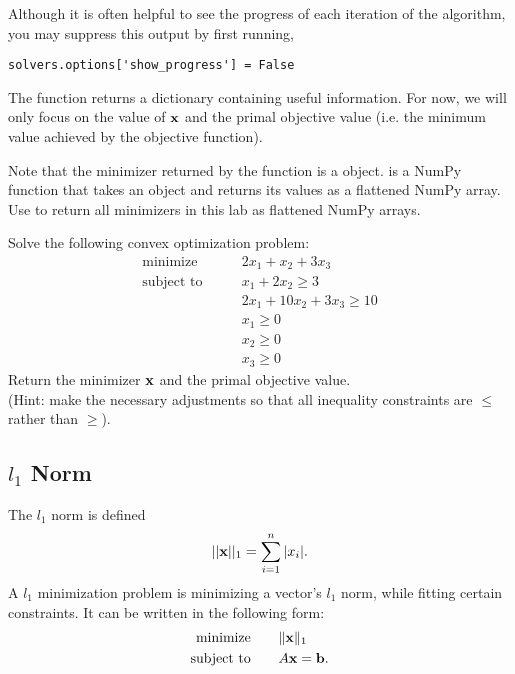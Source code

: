 
\begin{info}
Although it is often helpful to see the progress of each iteration of the algorithm, you may suppress this output by first running,
\begin{lstlisting}
solvers.options['show_progress'] = False
\end{lstlisting}
\end{info}

The function  returns a dictionary containing useful information.
For now, we will only focus on the value of $\mathbf{x}$ and the primal objective value (i.e. the minimum value achieved by the objective function).

\begin{warn}
Note that the minimizer  returned by the  function is a  object.
 is a NumPy function that takes an object and returns its values as a flattened NumPy array.
Use  to return all minimizers in this lab as flattened NumPy arrays.
\end{warn}

\begin{problem}
Solve the following convex optimization problem:
\begin{align*}
\text{minimize}\qquad &2x_1+x_2+3x_3 \\
\text{subject to}\qquad &x_1+2x_2 \geq 3 \\
	        &2x_1+10x_2+3x_3 \geq 10 \\
		&x_1 \geq 0 \\
		&x_2 \geq 0 \\
		&x_3 \geq 0
\end{align*}
Return the minimizer $\mathbf{x}$ and the primal objective value.
\\(Hint: make the necessary adjustments so that all inequality constraints are $\leq$ rather than $\geq$).
\end{problem}

\subsection*{$l_1$ Norm}
The $l_1$ norm is defined 
\[||\mathbf{x}||_1=\sum_{i=1}^n |x_i|.\]
A $l_1$ minimization problem is minimizing a vector's $l_1$ norm, while fitting certain constraints. It can be written in the following form:
\begin{align*}
\text{minimize}\qquad &\|\mathbf{x}\|_1\\
\text{subject to} \qquad &A\mathbf{x} = \mathbf{b}.
\end{align*}

